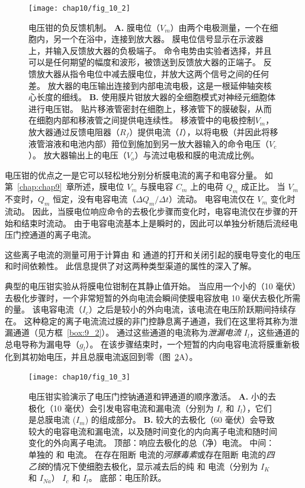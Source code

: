 \begin{figure}[htbp]
	\centering
	\texttt{[image: chap10/fig\_10\_2]}
	\caption{电压钳的负反馈机制。
	\textbf{A. }膜电位（$V_m$）由两个电极测量，一个在细胞内，另一个在浴中，连接到放大器。
	膜电位信号显示在示波器上，并输入反馈放大器的负极端子。
	命令电势由实验者选择，并且可以是任何期望的幅度和波形，被馈送到反馈放大器的正端子。
	反馈放大器从指令电位中减去膜电位，并放大这两个信号之间的任何差。
	放大器的电压输出连接到内部电流电极，这是一根延伸轴突核心长度的细线。
	\textbf{B. }使用膜片钳放大器的全细胞模式对神经元细胞体进行电压钳。
	贴片移液管密封在细胞上，移液管下的膜破裂，从而在细胞内部和移液管之间提供电连续性。
	移液管中的电极控制$V_m$，放大器通过反馈电阻器（$R_f$）提供电流（$I$），以将电极（并因此将移液管溶液和电池内部）箝位到施加到另一放大器输入的命令电压（$V_c$）。
	放大器输出上的电压（$V_o$）与流过电极和膜的电流成比例。}
	\label{fig:10_2}
\end{figure}



电压钳的优点之一是它可以轻松地分别分析膜电流的离子和电容分量。
如第~\ref{chap:chap9}~章所述，膜电位 $V_m$ 与膜电容 $C_m$ 上的电荷 $Q_m$ 成正比。
当 $V_m$ 不变时，$Q_m$ 恒定，没有电容电流（$\Delta Q_m / \Delta t）$流动。
电容电流仅在 $V_m$ 变化时流动。
因此，当膜电位响应命令的去极化步骤而变化时，电容电流仅在步骤的开始和结束时流动。
由于电容电流基本上是瞬时的，因此可以单独分析随后流经电压门控通道的离子电流。


这些离子电流的测量可用于计算由  和  通道的打开和关闭引起的膜电导变化的电压和时间依赖性。
此信息提供了对这两种类型渠道的属性的深入了解。


典型的电压钳实验从将膜电位钳制在其静止值开始。
当应用一个小的（10 毫伏）去极化步骤时，一个非常短暂的外向电流会瞬间使膜电容放电 10 毫伏去极化所需的量。
该电容电流（$I_c$）之后是较小的外向电流，该电流在电压阶跃期间持续存在。
这种稳定的离子电流流过膜的非门控静息离子通道，我们在这里将其称为泄漏通道（见方框~\ref{box:9_2}）。
通过这些通道的电流称为\textit{泄漏电流} $I_l$，这些通道的总电导称为漏电导（$g_l$）。
在该步骤结束时，一个短暂的内向电容电流将膜重新极化到其初始电压，并且总膜电流返回到零（图~\ref{fig:10_3}A）。


\begin{figure}[htbp]
	\centering
	\texttt{[image: chap10/fig\_10\_3]}
	\caption{电压钳实验演示了电压门控钠通道和钾通道的顺序激活。 
		\textbf{A.} 小的去极化（10 毫伏）会引发电容电流和漏电流（分别为 $I_c$ 和 $I_l$），它们是总膜电流 ($I_m$) 的组成部分。
		\textbf{B.} 较大的去极化（60 毫伏）会导致较大的电容电流和漏电流，以及随时间变化的内向离子电流和随时间变化的外向离子电流。
		顶部：响应去极化的总（净）电流。
		中间：单独的  和  电流。
		在存在阻断  电流的\textit{河豚毒素}或存在阻断  电流的\textit{四乙铵}的情况下使细胞去极化，显示减去后的纯  和  电流（分别为 $I_K$ 和 $I_{Na}$） $I_c$ 和 $I_l$。
		底部：电压阶跃。}
	\label{fig:10_3}
\end{figure}


